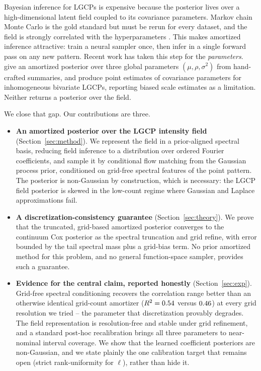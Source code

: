 \documentclass[10pt,twocolumn]{article}
\begin{document}
Bayesian inference for LGCPs is expensive because the posterior lives over a
high-dimensional latent field coupled to its covariance parameters. Markov chain
Monte Carlo is the gold standard but must be rerun for every dataset, and the
field is strongly correlated with the hyperparameters
\citep{christensen2005robust}. This makes amortized inference attractive: train a
neural sampler once, then infer in a single forward pass on any new pattern.
Recent work has taken this step for the \emph{parameters}. \citet{wang2025inference}
give an amortized posterior over three global parameters $(\mu,\rho,\sigma^2)$ from
hand-crafted summaries, and \citet{zou2026deep} produce point estimates of
covariance parameters for inhomogeneous bivariate LGCPs, reporting biased scale
estimates as a limitation. Neither returns a posterior over the field.

We close that gap. Our contributions are three.
\begin{itemize}\itemsep2pt
\item[\textbf{1.}] \textbf{An amortized posterior over the LGCP intensity field}
(Section~\ref{sec:method}). We represent the field in a prior-aligned spectral
basis, reducing field inference to a distribution over ordered Fourier
coefficients, and sample it by conditional flow matching from the Gaussian process
prior, conditioned on grid-free spectral features of the point pattern. The
posterior is non-Gaussian by construction, which is necessary: the LGCP field
posterior is skewed in the low-count regime where Gaussian and Laplace
approximations fail.
\item[\textbf{2.}] \textbf{A discretization-consistency guarantee}
(Section~\ref{sec:theory}). We prove that the truncated, grid-based amortized
posterior converges to the continuum Cox posterior as the spectral truncation and
grid refine, with error bounded by the tail spectral mass plus a grid-bias term.
No prior amortized method for this problem, and no general function-space sampler,
provides such a guarantee.
\item[\textbf{3.}] \textbf{Evidence for the central claim, reported honestly}
(Section~\ref{sec:exp}). Grid-free spectral conditioning recovers the correlation
range better than an otherwise identical grid-count amortizer
($R^2=0.54$ versus $0.46$) at every grid resolution we tried -- the
parameter that discretization provably degrades. The field
representation is resolution-free and stable under grid refinement, and a standard
post-hoc recalibration brings all three parameters to near-nominal interval
coverage. We show that the learned coefficient posteriors are non-Gaussian, and we
state plainly the one calibration target that remains open (strict rank-uniformity
for $\ell$), rather than hide it.
\end{itemize}
\end{document}
